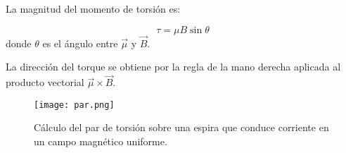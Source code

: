 La magnitud del momento de torsión es:

\begin{equation}
  \boxed{\tau = \mu B\sin\theta}
\end{equation}
donde \(\theta\) es el ángulo entre \(\vec{\mu}\) y \(\vec{B}\).
\begin{tcolorbox}[myconclusion]
  La dirección del torque se obtiene por la regla de la mano derecha aplicada al producto vectorial \(\vec{\mu} \times \vec{B}\).
\end{tcolorbox}
\begin{figure}[ht]
  \centering
  \texttt{[image: par.png]}
  \caption{Cálculo del par de torsión sobre una espira que conduce corriente en un campo magnético uniforme.}
\end{figure}